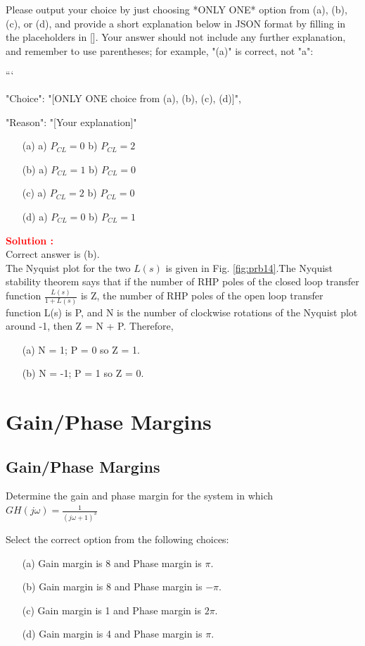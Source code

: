 \documentclass[12pt]{article}
\begin{document}
Please output your choice by just choosing *ONLY ONE* option from (a), (b), (c), or (d), and provide a short explanation below in JSON format by filling in the placeholders in []. Your answer should not include any further explanation, and remember to use parentheses; for example, "(a)" is correct, not "a":

```
{

"Choice": "[ONLY ONE choice from (a), (b), (c), (d)]",

"Reason": "[Your explanation]"

}

\begin{itemize}
    \item[(a)] a) \(P_{CL} = 0\) b) \(P_{CL} = 2\) 
    \item[(b)] a) \(P_{CL} = 1\) b) \(P_{CL} = 0\)
    \item[(c)] a) \(P_{CL} = 2\) b) \(P_{CL} = 0\)
    \item[(d)] a) \(P_{CL} = 0\) b) \(P_{CL} = 1\)
\end{itemize}

\textbf{\textcolor{red}{Solution :}} \\
Correct answer is (b).\\
The Nyquist plot for the two $L(s)$ is given in Fig. \ref{fig:prb14}.The Nyquist stability theorem says that if the number of RHP poles of the closed loop transfer function $\frac{L(s)}{1+L(s)}$ is Z, the number of RHP poles of the open loop transfer function L(s) is P, and N is the number of clockwise rotations of the Nyquist plot around -1, then Z = N + P. Therefore,
    \begin{itemize}
        \item [(a)] N = 1; P = 0 so Z = 1.
        \item [(b)] N = -1; P = 1 so Z = 0.
    \end{itemize}
\clearpage

\section{Gain/Phase Margins}
\subsection{Gain/Phase Margins}

Determine the gain and phase margin for the system in which \(GH(j\omega) = \frac{1}{(j\omega+1)^3}\)

Select the correct option from the following choices:
\begin{enumerate}
    \item [(a)] Gain margin is 8 and Phase margin is $\pi$. 
    \item [(b)] Gain margin is 8 and Phase margin is $-\pi$.
    \item [(c)] Gain margin is 1 and Phase margin is $2\pi$. 
    \item [(d)] Gain margin is 4 and Phase margin is $\pi$.
\end{enumerate}
\end{document}
